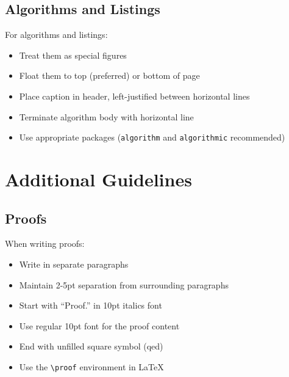 \subsection{Algorithms and Listings}
For algorithms and listings:
\begin{itemize}
\item Treat them as special figures
\item Float them to top (preferred) or bottom of page
\item Place caption in header, left-justified between horizontal lines
\item Terminate algorithm body with horizontal line
\item Use appropriate packages ({\tt algorithm} and {\tt algorithmic} recommended)
\end{itemize}

\section{Additional Guidelines}

\subsection{Proofs}
When writing proofs:
\begin{itemize}
\item Write in separate paragraphs
\item Maintain 2-5pt separation from surrounding paragraphs
\item Start with ``Proof.'' in 10pt italics font
\item Use regular 10pt font for the proof content
\item End with unfilled square symbol (qed)
\item Use the \texttt{\textbackslash{proof}} environment in \LaTeX
\end{itemize}
 
